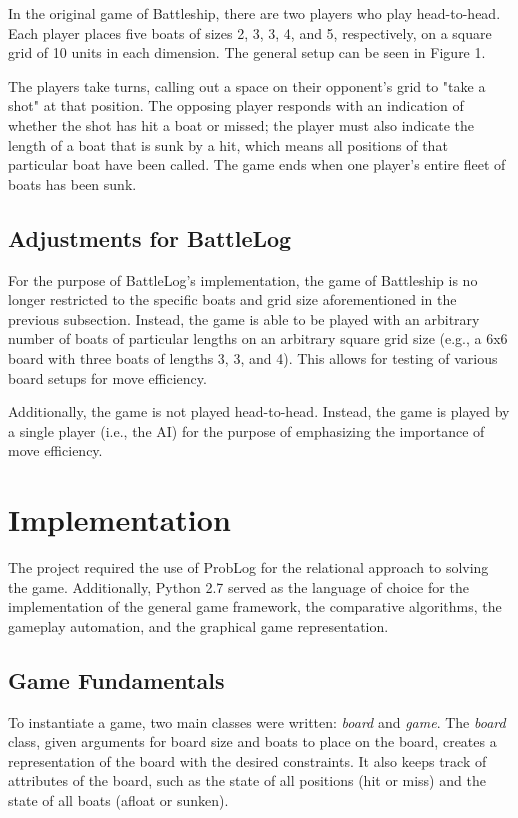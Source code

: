 \documentclass[]{article}
\begin{document}
In the original game of Battleship, there are two players who play head-to-head. Each player places five boats of sizes 2, 3, 3, 4, and 5, respectively, on a square grid of 10 units in each dimension. The general setup can be seen in Figure 1. 

The players take turns, calling out a space on their opponent's grid to "take a shot" at that position. The opposing player responds with an indication of whether the shot has hit a boat or missed; the player must also indicate the length of a boat that is sunk by a hit, which means all positions of that particular boat have been called. The game ends when one player's entire fleet of boats has been sunk.

\subsection{Adjustments for BattleLog}

For the purpose of BattleLog's implementation, the game of Battleship is no longer restricted to the specific boats and grid size aforementioned in the previous subsection. Instead, the game is able to be played with an arbitrary number of boats of particular lengths on an arbitrary square grid size (e.g., a 6x6 board with three boats of lengths 3, 3, and 4). This allows for testing of various board setups for move efficiency.

Additionally, the game is not played head-to-head. Instead, the game is played by a single player (i.e., the AI) for the purpose of emphasizing the importance of move efficiency. 

\section{Implementation}

The project required the use of ProbLog for the relational approach to solving the game. Additionally, Python 2.7 served as the language of choice for the implementation of the general game framework, the comparative algorithms, the gameplay automation, and the graphical game representation. 

\subsection{Game Fundamentals}

To instantiate a game, two main classes were written: \textit{board} and \textit{game}. The \textit{board} class, given arguments for board size and boats to place on the board, creates a representation of the board with the desired constraints. It also keeps track of attributes of the board, such as the state of all positions (hit or miss) and the state of all boats (afloat or sunken).
\end{document}
